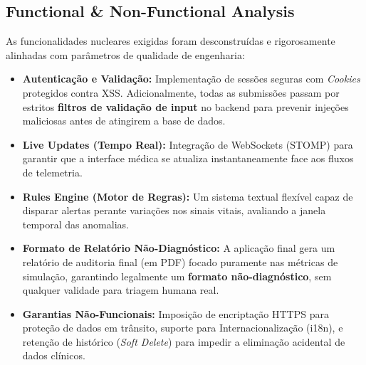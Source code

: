 \documentclass[11pt,a4paper]{article}
\begin{document}
\subsection{Functional \& Non-Functional Analysis}
As funcionalidades nucleares exigidas foram desconstruídas e rigorosamente alinhadas com parâmetros de qualidade de engenharia:
\begin{itemize}[label=\color{accentblue}$\bullet$]
    \item \textbf{Autenticação e Validação:} Implementação de sessões seguras com \textit{Cookies} protegidos contra XSS. Adicionalmente, todas as submissões passam por estritos \textbf{filtros de validação de input} no backend para prevenir injeções maliciosas antes de atingirem a base de dados.
    \item \textbf{Live Updates (Tempo Real):} Integração de WebSockets (STOMP) para garantir que a interface médica se atualiza instantaneamente face aos fluxos de telemetria.
    \item \textbf{Rules Engine (Motor de Regras):} Um sistema textual flexível capaz de disparar alertas perante variações nos sinais vitais, avaliando a janela temporal das anomalias.
    \item \textbf{Formato de Relatório Não-Diagnóstico:} A aplicação final gera um relatório de auditoria final (em PDF) focado puramente nas métricas de simulação, garantindo legalmente um \textbf{formato não-diagnóstico}, sem qualquer validade para triagem humana real.
    \item \textbf{Garantias Não-Funcionais:} Imposição de encriptação HTTPS para proteção de dados em trânsito, suporte para Internacionalização (i18n), e retenção de histórico (\textit{Soft Delete}) para impedir a eliminação acidental de dados clínicos.
\end{itemize}
\end{document}
